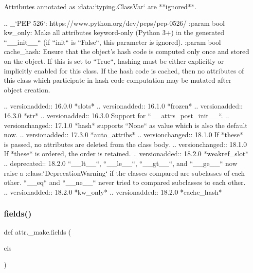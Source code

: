 \begin{DoxyVerb}
    Attributes annotated as :data:`typing.ClassVar` are **ignored**.

    .. _`PEP 526`: https://www.python.org/dev/peps/pep-0526/
:param bool kw_only: Make all attributes keyword-only (Python 3+)
    in the generated ``__init__`` (if ``init`` is ``False``, this
    parameter is ignored).
:param bool cache_hash: Ensure that the object's hash code is computed
    only once and stored on the object.  If this is set to ``True``,
    hashing must be either explicitly or implicitly enabled for this
    class.  If the hash code is cached, then no attributes of this
    class which participate in hash code computation may be mutated
    after object creation.


.. versionadded:: 16.0.0 *slots*
.. versionadded:: 16.1.0 *frozen*
.. versionadded:: 16.3.0 *str*
.. versionadded:: 16.3.0 Support for ``__attrs_post_init__``.
.. versionchanged:: 17.1.0
   *hash* supports ``None`` as value which is also the default now.
.. versionadded:: 17.3.0 *auto_attribs*
.. versionchanged:: 18.1.0
   If *these* is passed, no attributes are deleted from the class body.
.. versionchanged:: 18.1.0 If *these* is ordered, the order is retained.
.. versionadded:: 18.2.0 *weakref_slot*
.. deprecated:: 18.2.0
   ``__lt__``, ``__le__``, ``__gt__``, and ``__ge__`` now raise a
   :class:`DeprecationWarning` if the classes compared are subclasses of
   each other. ``__eq`` and ``__ne__`` never tried to compared subclasses
   to each other.
.. versionadded:: 18.2.0 *kw_only*
.. versionadded:: 18.2.0 *cache_hash*
\end{DoxyVerb}
 \mbox{\label{namespaceattr_1_1__make_a357e306d8a24fb39dbeebe59d704d352}} 
\subsubsection{\texorpdfstring{fields()}{fields()}}
{\footnotesize\ttfamily def attr.\+\_\+make.\+fields (\begin{DoxyParamCaption}\item[{}]{cls }\end{DoxyParamCaption})}

